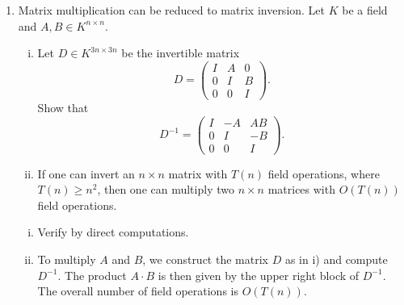 \documentclass[11pt]{article}
\begin{document}
\begin{enumerate}[1)]
\item Matrix multiplication can be reduced to matrix inversion. Let $K$ be a field and $A,B ∈ K^{n × n}$.
  \begin{enumerate}[i)]
  \item 
  Let $D ∈ K^{3n ×3n}$ be the invertible  matrix
  \begin{displaymath}
    D =
    \begin{pmatrix}
      I & A & 0 \\
      0 & I & B \\
      0 & 0 & I
    \end{pmatrix}. 
  \end{displaymath}
  Show that
  \begin{displaymath}
    D^{-1}  =
    \begin{pmatrix}
      I & -A & AB \\
      0 & I & -B \\
      0 & 0 & I
    \end{pmatrix}. 
  \end{displaymath}
\item If one can invert an $n×n$ matrix with $T(n)$ field operations, where $T(n) ≥ n^2$, then one can multiply two $n×n$ matrices with  $O(T(n))$ field operations. 
\end{enumerate}

\begin{solution}
\begin{enumerate}[i)]
\item Verify by direct computations.
\item To multiply $A$ and $B$, we construct the matrix $D$ as in i) and compute $D^{-1}$. The product $A \cdot B$ is then given by the upper right block of $D^{-1}$. The overall number of field operations is $O(T(n))$.
\end{enumerate}
\end{solution}

\end{enumerate}



  
\end{document}

